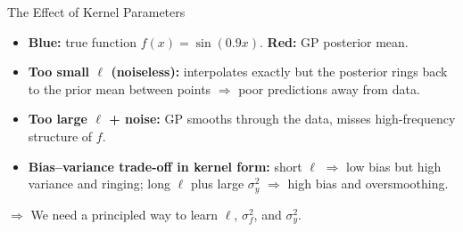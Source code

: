 \documentclass[aspectratio=169,11pt]{beamer}
\begin{document}
\begin{frame}[shrink=20]{The Effect of Kernel Parameters}
\vspace{0.2cm}
\begin{itemize}
  \item \textcolor{uzhblue}{\textbf{Blue:}} true function $f(x) = \sin(0.9x)$. \textcolor{harvardcrimson}{\textbf{Red:}} GP posterior mean.
  \item \textbf{Too small $\ell$ (noiseless):} interpolates exactly but the posterior rings back to the prior mean between points $\Rightarrow$ poor predictions away from data.
  \item \textbf{Too large $\ell$ + noise:} GP smooths through the data, misses high-frequency structure of $f$.
  \item \textbf{Bias--variance trade-off in kernel form:} short $\ell$ $\Rightarrow$ low bias but high variance and ringing; long $\ell$ plus large $\sigma_y^2$ $\Rightarrow$ high bias and oversmoothing.
\end{itemize}

$\Rightarrow$ We need a principled way to learn $\ell$, $\sigma_f^2$, and $\sigma_y^2$.
\end{frame}
\end{document}
